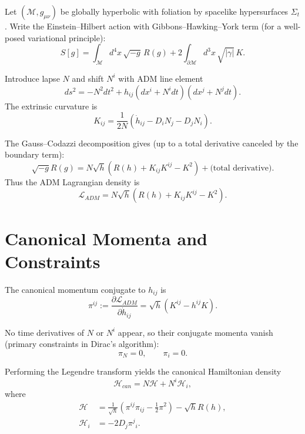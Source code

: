\documentclass[11pt]{article}
\theoremstyle{remark}
\theoremstyle{plain}
\begin{document}
Let $(\mathcal{M},g_{\mu\nu})$ be globally hyperbolic with foliation by spacelike hypersurfaces $\Sigma_t$.
Write the Einstein--Hilbert action with Gibbons--Hawking--York term (for a well-posed variational principle):
\begin{equation}
S[g] = \int_{\mathcal{M}} d^4x\,\sqrt{-g}\,R(g) + 2\int_{\partial\mathcal{M}} d^3x\,\sqrt{|\gamma|}\,K.
\end{equation}

Introduce lapse $N$ and shift $N^i$ with ADM line element
\begin{equation}
ds^2 = -N^2dt^2 + h_{ij}(dx^i+N^i dt)(dx^j+N^j dt).
\end{equation}
The extrinsic curvature is
\begin{equation}
K_{ij}=\frac{1}{2N}\left(\dot h_{ij}-D_iN_j-D_jN_i\right).
\end{equation}

The Gauss--Codazzi decomposition gives (up to a total derivative canceled by the boundary term):
\begin{equation}
\sqrt{-g}R(g) = N\sqrt{h}\left(R(h)+K_{ij}K^{ij}-K^2\right) + \text{(total derivative)}.
\end{equation}
Thus the ADM Lagrangian density is
\begin{equation}
\mathcal{L}_{ADM} = N\sqrt{h}\left(R(h)+K_{ij}K^{ij}-K^2\right).
\end{equation}

\section{Canonical Momenta and Constraints}

The canonical momentum conjugate to $h_{ij}$ is
\begin{equation}
\pi^{ij}:=\frac{\partial\mathcal{L}_{ADM}}{\partial \dot h_{ij}}=\sqrt{h}(K^{ij}-h^{ij}K).
\end{equation}

No time derivatives of $N$ or $N^i$ appear, so their conjugate momenta vanish (primary constraints in Dirac's algorithm):
\begin{equation}
\pi_N=0,\qquad \pi_i=0.
\end{equation}

Performing the Legendre transform yields the canonical Hamiltonian density
\begin{equation}
\mathcal{H}_{can}=N\mathcal{H}+N^i\mathcal{H}_i,
\end{equation}
where
\begin{align}
\mathcal{H} &= \frac{1}{\sqrt{h}}\left(\pi^{ij}\pi_{ij}-\frac{1}{2}\pi^2\right)-\sqrt{h}R(h),\\
\mathcal{H}_i &= -2D_j\pi^j{}_i.
\end{align}
\end{document}
